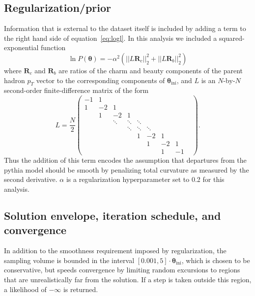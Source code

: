 \documentclass[12pt]{article}
\newcommand{\rvec}{\mathbf{R}}
\newcommand{\thetavec}{\mathbf{\theta}}
\newcommand{\prior}{P(\thetavec)}
\begin{document}
\subsection{Regularization/prior}
Information that is external to the dataset itself is included by adding a term to the right hand side of equation~\ref{eq:logl}. In this analysis we included a squared-exponential function
\begin{equation} \label{eq:l2reg}
  \ln \prior = -\alpha^2 \left(||L \rvec_c||_2^2 + ||L \rvec_b||_2^2\right)
\end{equation}
where $\rvec_c$ and $\rvec_b$ are ratios of the charm and beauty components of the parent hadron $p_T$ vector to the corresponding components of $\thetavec_{\mathrm{ini}}$, and $L$ is an $N$-by-$N$ second-order finite-difference matrix of the form
\begin{equation} \label{eq:lmatrix}
L = \frac{N}{2}
\begin{pmatrix}
-1 & 1 & & & & & &\\
1 & -2 & 1 & & & & &\\
& 1 & -2 & 1 & & & &\\

& & \ddots & \ddots & \ddots & & & &\\
& & & \ddots & \ddots & \ddots & & & \\

& & & & 1 & -2 & 1 &\\
& & & & & 1 & -2 & 1\\
& & & & & & 1 & -1
\end{pmatrix}.
\end{equation}
Thus the addition of this term encodes the assumption that departures from the pythia model should be smooth by penalizing total curvature as measured by the second derivative. $\alpha$ is a regularization hyperparameter set to 0.2 for this analysis.

\subsection{Solution envelope, iteration schedule, and convergence}
In addition to the smoothness requirement imposed by regularization, the sampling volume is bounded in the interval $[0.001, 5] \cdot \thetavec_{\mathrm{ini}}$, which is chosen to be conservative, but speeds convergence by limiting random excursions to regions that are unrealistically far from the solution. If a step is taken outside this region, a likelihood of $-\infty$ is returned.
\end{document}
